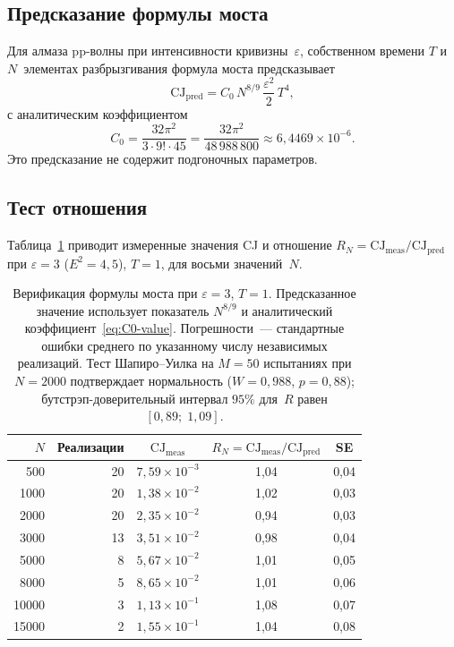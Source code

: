 \documentclass[12pt,a4paper]{article}
\theoremstyle{plain}
\theoremstyle{definition}
\theoremstyle{remark}
\newcommand{\CJ}{\mathrm{CJ}}
\begin{document}
\subsection{Предсказание формулы моста}
\label{sec:prediction}

Для алмаза pp-волны при интенсивности
кривизны~$\varepsilon$, собственном времени $T$ и $N$~элементах
разбрызгивания формула моста предсказывает
\begin{equation}\label{eq:CJ-pred}
  \CJ_{\mathrm{pred}} = C_0\, N^{8/9}\, \frac{\varepsilon^2}{2}\, T^4,
\end{equation}
с аналитическим коэффициентом
\begin{equation}\label{eq:C0-value}
  C_0 = \frac{32\pi^2}{3 \cdot 9! \cdot 45}
  = \frac{32\pi^2}{48\,988\,800}
  \approx 6{,}4469 \times 10^{-6}.
\end{equation}
Это предсказание не содержит подгоночных параметров.

\subsection{Тест отношения}
\label{sec:ratio}

Таблица~\ref{tab:ratio} приводит измеренные значения CJ
и отношение $R_N = \CJ_{\mathrm{meas}} / \CJ_{\mathrm{pred}}$
при $\varepsilon = 3$ ($E^2 = 4{,}5$), $T = 1$, для восьми
значений~$N$.

\begin{table}[ht]
\centering
\caption{Верификация формулы моста при $\varepsilon = 3$,
$T = 1$.  Предсказанное значение использует показатель
$N^{8/9}$ и аналитический
коэффициент~\eqref{eq:C0-value}.  Погрешности~--- стандартные
ошибки среднего по указанному числу независимых реализаций.
Тест Шапиро--Уилка на $M = 50$ испытаниях при $N = 2000$
подтверждает нормальность ($W = 0{,}988$, $p = 0{,}88$);
бутстрэп-доверительный интервал $95\%$ для~$R$ равен
$[0{,}89;\; 1{,}09]$.}
\label{tab:ratio}
\begin{tabular}{rrccc}
\toprule
$N$ & Реализации & $\CJ_{\mathrm{meas}}$
    & $R_N = \CJ_{\mathrm{meas}}/\CJ_{\mathrm{pred}}$ & SE \\
\midrule
  500 & 20 & $7{,}59 \times 10^{-3}$ & 1,04 & 0,04 \\
 1000 & 20 & $1{,}38 \times 10^{-2}$ & 1,02 & 0,03 \\
 2000 & 20 & $2{,}35 \times 10^{-2}$ & 0,94 & 0,03 \\
 3000 & 13 & $3{,}51 \times 10^{-2}$ & 0,98 & 0,04 \\
 5000 &  8 & $5{,}67 \times 10^{-2}$ & 1,01 & 0,05 \\
 8000 &  5 & $8{,}65 \times 10^{-2}$ & 1,01 & 0,06 \\
10000 &  3 & $1{,}13 \times 10^{-1}$ & 1,08 & 0,07 \\
15000 &  2 & $1{,}55 \times 10^{-1}$ & 1,04 & 0,08 \\
\bottomrule
\end{tabular}
\end{table}
\end{document}
